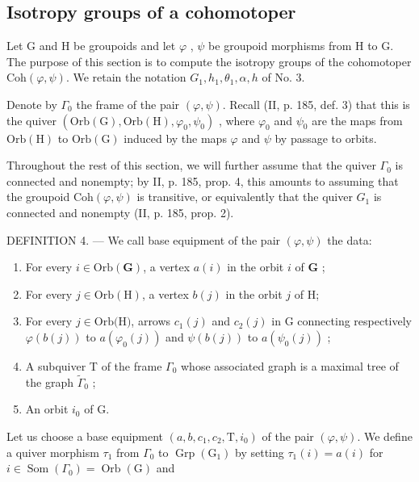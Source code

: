 \subsection{Isotropy groups of a cohomotoper}

Let G and H be groupoids and let \(\varphi\) , \(\psi\) be groupoid morphisms from H to G. The purpose of this section is to compute the isotropy groups of the cohomotoper \(\mathrm{Coh}(\varphi, \psi)\). We retain the notation \(G_1, h_1, \theta_1, \alpha, h\) of No. 3.

Denote by \(\Gamma_{0}\) the frame of the pair \((\varphi,\psi)\). Recall (II, p. 185, def. 3) that this is the quiver \((\mathrm{Orb}(\mathrm{G}),\mathrm{Orb}(\mathrm{H}),\varphi_{0},\psi_{0})\) , where \(\varphi_{0}\) and \(\psi_{0}\) are the maps from \(\mathrm{Orb}(\mathrm{H})\) to \(\mathrm{Orb}(\mathrm{G})\) induced by the maps \(\varphi\) and \(\psi\) by passage to orbits.

Throughout the rest of this section, we will further assume that the quiver \(\Gamma_{0}\) is connected and nonempty; by II, p. 185, prop. 4, this amounts to assuming that the groupoid \(\mathrm{Coh}(\varphi,\psi)\) is transitive, or equivalently that the quiver \(G_{1}\) is connected and nonempty (II, p. 185, prop. 2).

DEFINITION 4. --- We call base equipment of the pair \((\varphi, \psi)\) the data:

\begin{enumerate}
\def\labelenumi{(\roman{enumi})}
\item
  For every \(i \in \mathrm{Orb}(\mathbf{G})\), a vertex \(a(i)\) in the orbit \(i\) of \(\mathbf{G}\) ;
\item
  For every \(j \in \mathrm{Orb}(\mathrm{H})\), a vertex \(b(j)\) in the orbit \(j\) of H;
\item
  For every \(j \in \text{Orb(H)}\), arrows \(c_{1}(j)\) and \(c_{2}(j)\) in G connecting respectively \(\varphi(b(j))\) to \(a(\varphi_{0}(j))\) and \(\psi(b(j))\) to \(a(\psi_{0}(j))\) ;
\item
  A subquiver T of the frame \(\Gamma_{0}\) whose associated graph is a maximal tree of the graph \(\widetilde{\Gamma}_{0}\) ;
\item
  An orbit \(i_{0}\) of G.
\end{enumerate}

Let us choose a base equipment \((a,b,c_{1},c_{2},\mathrm{T},i_{0})\) of the pair \((\varphi,\psi)\). We define a quiver morphism \(\tau_{1}\) from \(\Gamma_{0}\) to \(\operatorname{Grp}(\mathrm{G}_{1})\) by setting \(\tau_{1}(i)=a(i)\) for \(i\in\operatorname{Som}(\Gamma_{0})=\operatorname{Orb}(\mathrm{G})\) and

